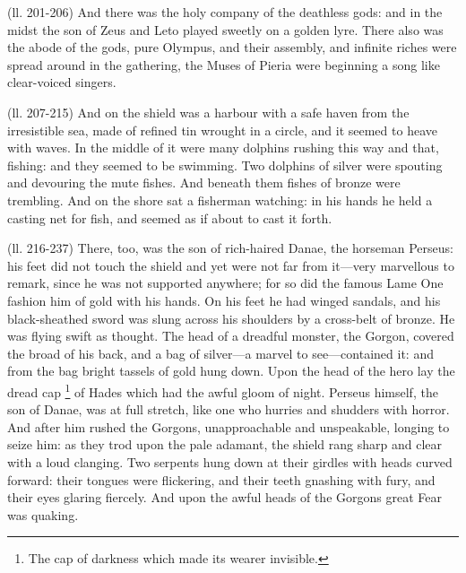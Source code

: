 (ll. 201-206) And there was the holy company of the deathless gods: and in the
midst the son of Zeus and Leto played sweetly on a golden lyre. There also was
the abode of the gods, pure Olympus, and their assembly, and infinite riches
were spread around in the gathering, the Muses of Pieria were beginning a song
like clear-voiced singers.

(ll. 207-215) And on the shield was a harbour with a safe haven from the
irresistible sea, made of refined tin wrought in a circle, and it seemed to
heave with waves. In the middle of it were many dolphins rushing this way and
that, fishing: and they seemed to be swimming. Two dolphins of silver were
spouting and devouring the mute fishes. And beneath them fishes of bronze were
trembling. And on the shore sat a fisherman watching: in his hands he held a
casting net for fish, and seemed as if about to cast it forth.

(ll. 216-237) There, too, was the son of rich-haired Danae, the horseman
Perseus: his feet did not touch the shield and yet were not far from
it—very marvellous to remark, since he was not supported anywhere; for so
did the famous Lame One fashion him of gold with his hands. On his feet he had
winged sandals, and his black-sheathed sword was slung across his shoulders by
a cross-belt of bronze. He was flying swift as thought. The head of a dreadful
monster, the Gorgon, covered the broad of his back, and a bag of silver—a
marvel to see—contained it: and from the bag bright tassels of gold hung
down. Upon the head of the hero lay the dread cap \footnote{The cap of darkness which
made its wearer invisible.} of Hades
which had the awful gloom of night. Perseus himself, the son of Danae, was at
full stretch, like one who hurries and shudders with horror. And after him
rushed the Gorgons, unapproachable and unspeakable, longing to seize him: as
they trod upon the pale adamant, the shield rang sharp and clear with a loud
clanging. Two serpents hung down at their girdles with heads curved forward:
their tongues were flickering, and their teeth gnashing with fury, and their
eyes glaring fiercely. And upon the awful heads of the Gorgons great Fear was
quaking.


